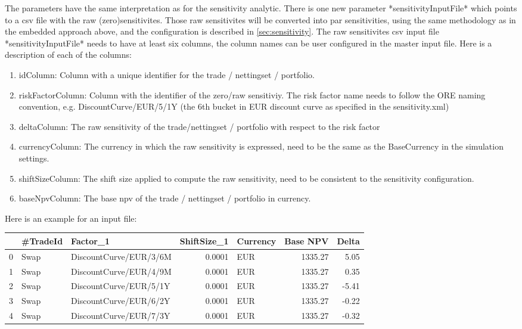 {The parameters have the same interpretation as for the sensitivity analytic. There is one new parameter *sensitivityInputFile* which points to a csv file with the raw (zero)sensitivites. Those raw sensitivites will be converted into par sensitivities, using the same methodology as in the embedded approach above, and the configuration is described in \ref{sec:sensitivity}.
The raw sensitivites csv input file *sensitivityInputFile* needs to have at least six columns, the column names can be user configured in the master input file. Here is a description of each of the columns:
\begin{enumerate}
\item idColumn: Column with a unique identifier for the trade / nettingset / portfolio.
\item riskFactorColumn: Column with the identifier of the zero/raw sensitiviy. The risk factor name needs to follow the ORE naming convention, e.g. DiscountCurve/EUR/5/1Y (the 6th bucket in EUR discount curve as specified in the sensitivity.xml)\
\item deltaColumn: The raw sensitivity of the trade/nettingset / portfolio with respect to the risk factor
\item currencyColumn: The currency in which the raw sensitivity is expressed, need to be the same as the BaseCurrency in the simulation settings.
\item shiftSizeColumn: The shift size applied to compute the raw sensitivity, need to be consistent to the sensitivity configuration.
\item baseNpvColumn: The base npv of the trade / nettingset / portfolio in currency.
\end{enumerate}
Here is an example for an input file:
\begin{table}[hbt]
\scriptsize
\begin{center}
\begin{tabular}{lllrlrr}
\hline
{} & \#TradeId &                Factor\_1 &  ShiftSize\_1 & Currency &  Base NPV &  Delta \\
\hline
0 &     Swap &  DiscountCurve/EUR/3/6M &       0.0001 &      EUR &   1335.27 &   5.05 \\
1 &     Swap &  DiscountCurve/EUR/4/9M &       0.0001 &      EUR &   1335.27 &   0.35 \\
2 &     Swap &  DiscountCurve/EUR/5/1Y &       0.0001 &      EUR &   1335.27 &  -5.41 \\
3 &     Swap &  DiscountCurve/EUR/6/2Y &       0.0001 &      EUR &   1335.27 &  -0.22 \\
4 &     Swap &  DiscountCurve/EUR/7/3Y &       0.0001 &      EUR &   1335.27 &  -0.32 \\
\hline
\end{tabular}
\end{center}
\end{table}

}

